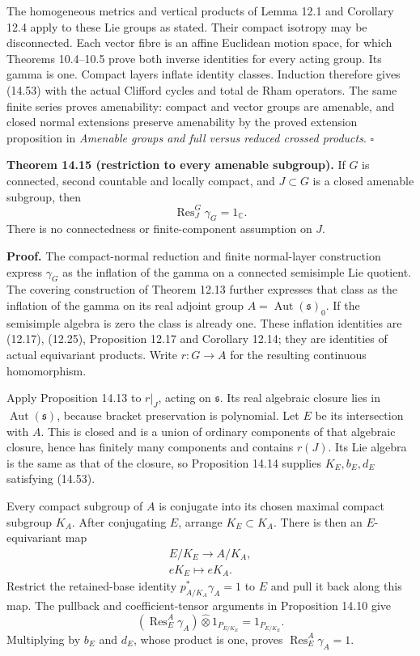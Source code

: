 \documentclass[
  11pt,
]{article}
\begin{document}
The homogeneous metrics and vertical products of Lemma 12.1 and
Corollary 12.4 apply to these Lie groups as stated. Their compact
isotropy may be disconnected. Each vector fibre is an affine Euclidean
motion space, for which Theorems 10.4--10.5 prove both inverse
identities for every acting group. Its gamma is one. Compact layers
inflate identity classes. Induction therefore gives (14.53) with the
actual Clifford cycles and total de Rham operators. The same finite
series proves amenability: compact and vector groups are amenable, and
closed normal extensions preserve amenability by the proved extension
proposition in \emph{Amenable groups and full versus reduced crossed
products}. \(\square\)

\textbf{Theorem 14.15 (restriction to every amenable subgroup).} If
\(G\) is connected, second countable and locally compact, and
\(J\subset G\) is a closed amenable subgroup, then \[
\operatorname{Res}^G_J\gamma_G=1_{\mathbb C}.
\tag{14.54}
\] There is no connectedness or finite-component assumption on \(J\).

\textbf{Proof.} The compact-normal reduction and finite normal-layer
construction express \(\gamma_G\) as the inflation of the gamma on a
connected semisimple Lie quotient. The covering construction of Theorem
12.13 further expresses that class as the inflation of the gamma on its
real adjoint group \(A=\operatorname{Aut}(\mathfrak s)_0\). If the
semisimple algebra is zero the class is already one. These inflation
identities are (12.17), (12.25), Proposition 12.17 and Corollary 12.14;
they are identities of actual equivariant products. Write \(r:G\to A\)
for the resulting continuous homomorphism.

Apply Proposition 14.13 to \(r|_J\), acting on \(\mathfrak s\). Its real
algebraic closure lies in \(\operatorname{Aut}(\mathfrak s)\), because
bracket preservation is polynomial. Let \(E\) be its intersection with
\(A\). This is closed and is a union of ordinary components of that
algebraic closure, hence has finitely many components and contains
\(r(J)\). Its Lie algebra is the same as that of the closure, so
Proposition 14.14 supplies \(K_E,b_E,d_E\) satisfying (14.53).

Every compact subgroup of \(A\) is conjugate into its chosen maximal
compact subgroup \(K_A\). After conjugating \(E\), arrange
\(K_E\subset K_A\). There is then an \(E\)-equivariant map \[
\begin{gathered}
E/K_E\longrightarrow A/K_A,\\
eK_E\longmapsto eK_A.
\end{gathered}
\tag{14.55}
\] Restrict the retained-base identity \(p_{A/K_A}^*\gamma_A=1\) to
\(E\) and pull it back along this map. The pullback and
coefficient-tensor arguments in Proposition 14.10 give \[
(\operatorname{Res}^A_E\gamma_A)
 \widehat\otimes1_{P_{E/K_E}}
=1_{P_{E/K_E}}.
\tag{14.56}
\] Multiplying by \(b_E\) and \(d_E\), whose product is one, proves
\(\operatorname{Res}^A_E\gamma_A=1\).
\end{document}
